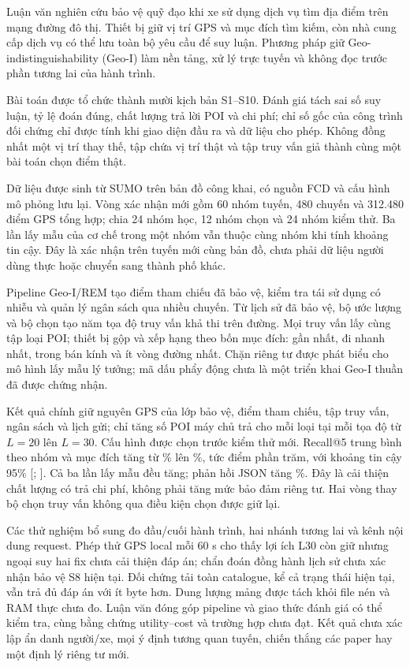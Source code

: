 \documentclass[12pt,a4paper,oneside]{report}
\begin{document}
Luận văn nghiên cứu bảo vệ quỹ đạo khi xe sử dụng dịch vụ tìm địa điểm trên mạng đường đô thị. Thiết bị giữ vị trí GPS và mục đích tìm kiếm, còn nhà cung cấp dịch vụ có thể lưu toàn bộ yêu cầu để suy luận. Phương pháp giữ Geo-indistinguishability (Geo-I) làm nền tảng, xử lý trực tuyến và không đọc trước phần tương lai của hành trình.

Bài toán được tổ chức thành mười kịch bản S1--S10. Đánh giá tách sai số suy luận, tỷ lệ đoán đúng, chất lượng trả lời POI và chi phí; chỉ số gốc của công trình đối chứng chỉ được tính khi giao diện đầu ra và dữ liệu cho phép. Không đồng nhất một vị trí thay thế, tập chứa vị trí thật và tập truy vấn giả thành cùng một bài toán chọn điểm thật.

Dữ liệu được sinh từ SUMO trên bản đồ công khai, có nguồn FCD và cấu hình mô phỏng lưu lại. Vòng xác nhận mới gồm 60 nhóm tuyến, 480 chuyến và 312.480 điểm GPS tổng hợp; chia 24 nhóm học, 12 nhóm chọn và 24 nhóm kiểm thử. Ba lần lấy mẫu của cơ chế trong một nhóm vẫn thuộc cùng nhóm khi tính khoảng tin cậy. Đây là xác nhận trên tuyến mới cùng bản đồ, chưa phải dữ liệu người dùng thực hoặc chuyển sang thành phố khác.

Pipeline Geo-I/REM tạo điểm tham chiếu đã bảo vệ, kiểm tra tái sử dụng có nhiễu và quản lý ngân sách qua nhiều chuyến. Từ lịch sử đã bảo vệ, bộ ước lượng và bộ chọn tạo năm tọa độ truy vấn khả thi trên đường. Mọi truy vấn lấy cùng tập loại POI; thiết bị gộp và xếp hạng theo bốn mục đích: gần nhất, đi nhanh nhất, trong bán kính và ít vòng đường nhất. Chặn riêng tư được phát biểu cho mô hình lấy mẫu lý tưởng; mã dấu phẩy động chưa là một triển khai Geo-I thuần đã được chứng nhận.

Kết quả chính giữ nguyên GPS của lớp bảo vệ, điểm tham chiếu, tập truy vấn, ngân sách và lịch gửi; chỉ tăng số POI máy chủ trả cho mỗi loại tại mỗi tọa độ từ $L=20$ lên $L=30$. Cấu hình được chọn trước kiểm thử mới. Recall@5 trung bình theo nhóm và mục đích tăng từ \EvalFreshRecallBefore{}\% lên \EvalFreshRecallAfter{}\%, tức \EvalFreshGain{} điểm phần trăm, với khoảng tin cậy 95\% [\EvalFreshLow{}; \EvalFreshHigh{}]. Cả ba lần lấy mẫu đều tăng; phản hồi JSON tăng \EvalReplyGrowth{}\%. Đây là cải thiện chất lượng có trả chi phí, không phải tăng mức bảo đảm riêng tư. Hai vòng thay bộ chọn truy vấn không qua điều kiện chọn được giữ lại.

Các thử nghiệm bổ sung đo đầu/cuối hành trình, hai nhánh tương lai và kênh nội dung request. Phép thử GPS local mỗi 60 s cho thấy lợi ích L30 còn giữ nhưng ngoại suy hai fix chưa cải thiện đáp án; chẩn đoán đồng hành lịch sử chưa xác nhận bảo vệ S8 hiện tại. Đối chứng tải toàn catalogue, kể cả trạng thái hiện tại, vẫn trả đủ đáp án với ít byte hơn. Dung lượng mảng được tách khỏi file nén và RAM thực chưa đo. Luận văn đóng góp pipeline và giao thức đánh giá có thể kiểm tra, cùng bằng chứng utility--cost và trường hợp chưa đạt. Kết quả chưa xác lập ẩn danh người/xe, mọi ý định tương quan tuyến, chiến thắng các paper hay một định lý riêng tư mới.
\end{document}
